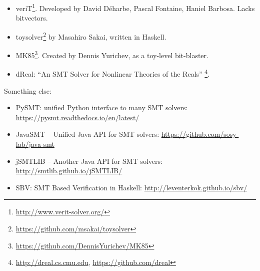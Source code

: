 \begin{itemize}
\item veriT\footnote{\url{http://www.verit-solver.org/}}.
Developed by David Déharbe, Pascal Fontaine, Haniel Barbosa.
Lacks bitvectors.

\item toysolver\footnote{\url{https://github.com/msakai/toysolver}} by Masahiro Sakai, written in Haskell.

\item MK85\footnote{\url{https://github.com/DennisYurichev/MK85}}. Created by Dennis Yurichev, as a toy-level bit-blaster.

\item dReal: ``An SMT Solver for Nonlinear Theories of the Reals''
\footnote{\url{http://dreal.cs.cmu.edu}, \url{https://github.com/dreal}}.

\end{itemize}

Something else:

\begin{itemize}

\item PySMT: unified Python interface to many SMT solvers: \url{https://pysmt.readthedocs.io/en/latest/}

\item JavaSMT -- Unified Java API for SMT solvers: \url{https://github.com/sosy-lab/java-smt}

\item jSMTLIB -- Another Java API for SMT solvers: \url{http://smtlib.github.io/jSMTLIB/}

\item SBV: SMT Based Verification in Haskell: \url{http://leventerkok.github.io/sbv/}

\end{itemize}


